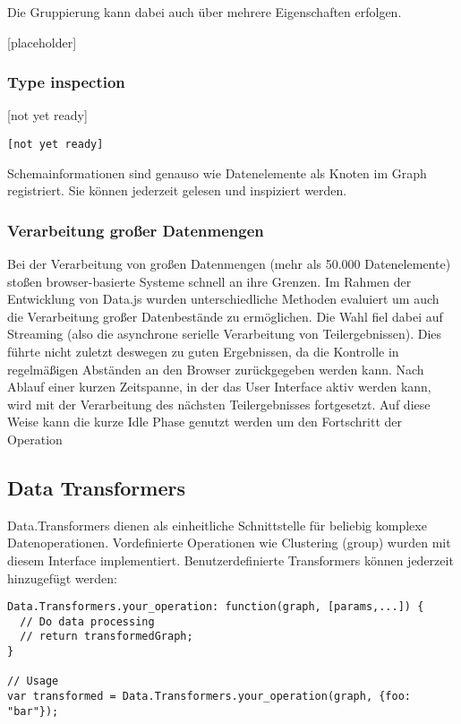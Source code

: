 \documentclass[runningheads]{llncs}
\begin{document}
Die Gruppierung kann dabei auch über mehrere Eigenschaften erfolgen. 

[placeholder]

\subsubsection{Type inspection}


[not yet ready]\begin{verbatim}
[not yet ready]
\end{verbatim}


Schemainformationen sind genauso wie Datenelemente als Knoten im Graph registriert. Sie können jederzeit gelesen und inspiziert werden. 

\subsubsection{Verarbeitung großer Datenmengen}


Bei der Verarbeitung von großen Datenmengen (mehr als 50.000 Datenelemente) stoßen browser-basierte Systeme schnell an ihre Grenzen. Im Rahmen der Entwicklung von Data.js wurden unterschiedliche Methoden evaluiert um auch die Verarbeitung großer Datenbestände zu ermöglichen. Die Wahl fiel dabei auf Streaming (also die asynchrone serielle Verarbeitung von Teilergebnissen). Dies führte nicht zuletzt deswegen zu guten Ergebnissen, da die Kontrolle in regelmäßigen Abständen an den Browser zurückgegeben werden kann. Nach Ablauf einer kurzen Zeitspanne, in der das User Interface aktiv werden kann, wird mit der Verarbeitung des nächsten Teilergebnisses fortgesetzt. Auf diese Weise kann die kurze Idle Phase genutzt werden um den Fortschritt der Operation 

\subsection{Data Transformers}


Data.Transformers dienen als einheitliche Schnittstelle für beliebig komplexe Datenoperationen. Vordefinierte Operationen wie Clustering (group) wurden mit diesem Interface implementiert. Benutzerdefinierte Transformers können jederzeit hinzugefügt werden:\begin{verbatim}
Data.Transformers.your_operation: function(graph, [params,...]) {
  // Do data processing
  // return transformedGraph;
}

// Usage
var transformed = Data.Transformers.your_operation(graph, {foo: "bar"});
\end{verbatim}
\end{document}
